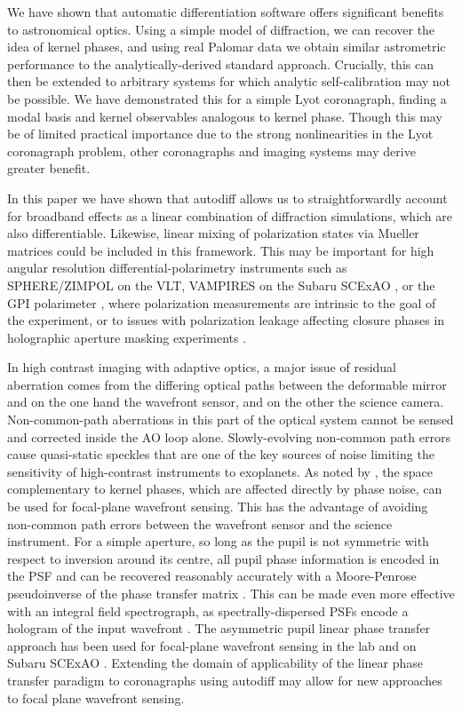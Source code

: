 \documentclass[modern]{aastex63}
\begin{document}
We have shown that automatic differentiation software offers significant benefits to astronomical optics. Using a simple model of diffraction, we can recover the idea of kernel phases, and using real Palomar data we obtain similar astrometric performance to the analytically-derived standard approach. Crucially, this can then be extended to arbitrary systems for which analytic self-calibration may not be possible. We have demonstrated this for a simple Lyot coronagraph, finding a modal basis and kernel observables analogous to kernel phase. Though this may be of limited practical importance due to the strong nonlinearities in the Lyot coronagraph problem, other coronagraphs and imaging systems may derive greater benefit.

In this paper we have shown that autodiff allows us to straightforwardly account for broadband effects as a linear combination of diffraction simulations, which are also differentiable. Likewise, linear mixing of polarization states via Mueller matrices could be included in this framework. This may be important for high angular resolution differential-polarimetry instruments such as SPHERE/ZIMPOL \citep{zimpol} on the VLT, VAMPIRES on the Subaru SCExAO \citep{vampires}, or the GPI polarimeter \citep{gpipol}, where polarization measurements are intrinsic to the goal of the experiment, or to issues with polarization leakage affecting closure phases in holographic aperture masking experiments \citep[e.g.][]{doelman18}.

In high contrast imaging with adaptive optics, a major issue of residual aberration comes from the differing optical paths between the deformable mirror and on the one hand the wavefront sensor, and on the other the science camera. Non-common-path aberrations in this part of the optical system cannot be sensed and corrected inside the AO loop alone. Slowly-evolving non-common path errors cause quasi-static speckles that are one of the key sources of noise limiting the sensitivity of high-contrast instruments to exoplanets. As noted by \citet{martinache13}, the space complementary to kernel phases, which are affected directly by phase noise, can be used for focal-plane wavefront sensing. This has the advantage of avoiding non-common path errors between the wavefront sensor and the science instrument. For a simple aperture, so long as the pupil is not symmetric with respect to inversion around its centre, all pupil phase information is encoded in the PSF and can be recovered reasonably accurately with a Moore-Penrose pseudoinverse of the phase transfer matrix \citep{moore1920,bjerhammar1951,penrose_1955}. This can be made even more effective with an integral field spectrograph, as spectrally-dispersed PSFs encode a hologram of the input wavefront \citep{martinache16}. The asymmetric pupil linear phase transfer approach has been used for focal-plane wavefront sensing in the lab \citep[e.g.][]{pope14,swift} and on Subaru SCExAO \citep{martinache16b}. Extending the domain of applicability of the linear phase transfer paradigm to coronagraphs using autodiff may allow for new approaches to focal plane wavefront sensing. 
\end{document}
